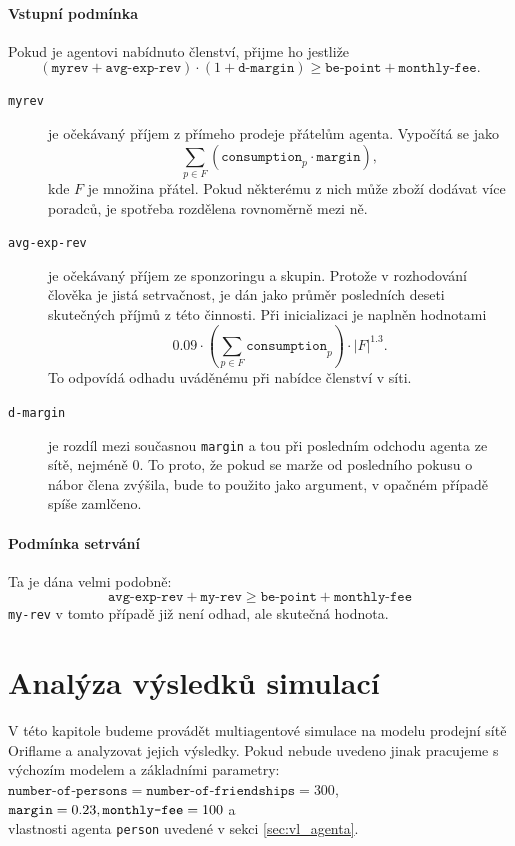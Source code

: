 \documentclass[a4wide,12pt]{report}
\begin{document}
\subsubsection{Vstupní podmínka}
Pokud je agentovi nabídnuto členství, přijme ho jestliže
\[(\texttt{myrev} + \texttt{avg-exp-rev}) \cdot (1+\texttt{d-margin}) \geq \texttt{be-point} + \texttt{monthly-fee}.\]
\begin{description}
\item[\texttt{myrev}] je očekávaný příjem z přímeho prodeje přátelům agenta. Vypočítá se jako \[\sum_{p\in F}(\texttt{consumption}_p\cdot\texttt{margin}),\]
kde $F$ je množina přátel. Pokud některému z nich může zboží dodávat více poradců, je spotřeba rozdělena rovnoměrně mezi ně.
\item[\texttt{avg-exp-rev}] je očekávaný příjem ze sponzoringu a skupin. Protože v rozhodování člověka je jistá setrvačnost, je dán jako průměr posledních deseti skutečných příjmů z této činnosti. Při inicializaci je naplněn hodnotami
\[ 0.09\cdot (\sum_{p\in F}\texttt{consumption}_p)\cdot |F|^{1.3}.\]
To odpovídá odhadu uváděnému při nabídce členství v síti.
\item[\texttt{d-margin}] je rozdíl mezi současnou \texttt{margin} a tou při posledním odchodu agenta ze sítě, nejméně 0. To proto, že pokud se marže od posledního pokusu o nábor člena zvýšila, bude to použito jako argument, v opačném případě spíše zamlčeno.
\end{description}
\subsubsection{Podmínka setrvání}
Ta je dána velmi podobně:
\[ \texttt{avg-exp-rev} + \texttt{my-rev} \geq \texttt{be-point} + \texttt{monthly-fee} \]
\texttt{my-rev} v tomto případě již není odhad, ale skutečná hodnota.
%
%
%
\chapter{Analýza výsledků simulací}
V této kapitole budeme provádět multiagentové simulace na modelu prodejní sítě Oriflame a analyzovat jejich výsledky. Pokud nebude uvedeno jinak pracujeme s výchozím modelem a základními parametry:\\
$\texttt{number-of-persons}=\texttt{number-of-friendships}=300$, \\
$\texttt{margin}=0.23,\\\texttt{monthly-fee}=100$ a\\
vlastnosti agenta \texttt{person} uvedené v sekci \ref{sec:vl_agenta}.
\end{document}
